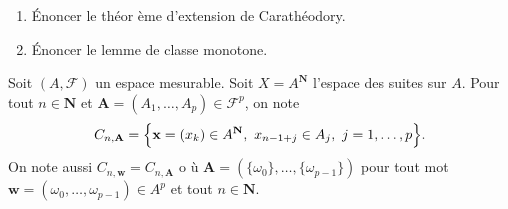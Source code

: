 \documentclass[a4paper,10pt,openany]{article}
\theoremstyle{plain}
\theoremstyle{definition}
\newcommand{\N}{\mathbf{N}}
\begin{document}
\vspace{0.6cm}

 \vspace{1.5mm} 
\begin{enumerate}
\item \'Enoncer le th\'eor \`eme d'extension de Carath\'eodory.
\item \'Enoncer le lemme de classe monotone.
\end{enumerate}
\vspace{0.6cm}

 \vspace{1.5mm} 

Soit $(A,\mathcal{F})$ un espace mesurable. Soit $X = A^\N$ l'espace des suites sur $A$. Pour tout $n \in \N$ et $\mathbf{A} = (A_1, \dots, A_p) \in \mathcal{F}^p$, on note 
$$
C_{n,\mathbf{A}} = \Bigl\{ \mathbf{x} = (x_k) \in A^\N,~x_{n-1+j} \in A_j, ~j = 1, \dots, p\Bigr\}.
$$
On note aussi $C_{n, \mathbf{w}} = C_{n,\mathbf{A}}$ o \`u $\mathbf{A} = (\{\omega_0\}, \dots, \{\omega_{p-1}\})$ pour tout mot $\mathbf{w} = (\omega_0, \dots, \omega_{p-1}) \in A^p$ et tout $n \in \N$.
\end{document}
